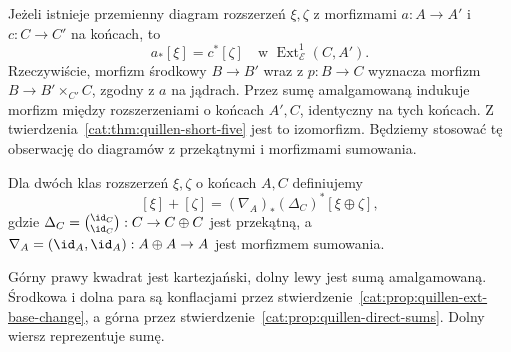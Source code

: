 \begin{uwaga}\label{cat:rem:quillen-ext-morphism}
Jeżeli istnieje przemienny diagram rozszerzeń $\xi,\zeta$ z morfizmami $a:A\to A'$ i $c:C\to C'$ na końcach, to
\[
 a_*[\xi]=c^*[\zeta]\quad\text{w }\operatorname{Ext}^1_{\mathscr E}(C,A').
\]
Rzeczywiście, morfizm środkowy $B\to B'$ wraz z $p:B\to C$ wyznacza morfizm $B\to B'\times_{C'}C$, zgodny z $a$ na jądrach. Przez sumę amalgamowaną indukuje morfizm między rozszerzeniami o końcach $A',C$, identyczny na tych końcach. Z twierdzenia~\ref{cat:thm:quillen-short-five} jest to izomorfizm. Będziemy stosować tę obserwację do diagramów z przekątnymi i morfizmami sumowania.
\end{uwaga}

\begin{definicja}\label{cat:def:quillen-baer}
Dla dwóch klas rozszerzeń $\xi,\zeta$ o końcach $A,C$ definiujemy
\[
 [\xi]+[\zeta]
 =(\nabla_A)_*(\Delta_C)^*[\xi\oplus\zeta],
\]
gdzie $\Delta_C=\binom{\id_C}{\id_C}:C\to C\oplus C$ jest przekątną, a $\nabla_A=(\id_A,\id_A):A\oplus A\to A$ jest morfizmem sumowania.
\end{definicja}

\begin{center}
\end{center}
Górny prawy kwadrat jest kartezjański, dolny lewy jest sumą amalgamowaną. Środkowa i dolna para są konflacjami przez stwierdzenie~\ref{cat:prop:quillen-ext-base-change}, a górna przez stwierdzenie~\ref{cat:prop:quillen-direct-sums}. Dolny wiersz reprezentuje sumę.

